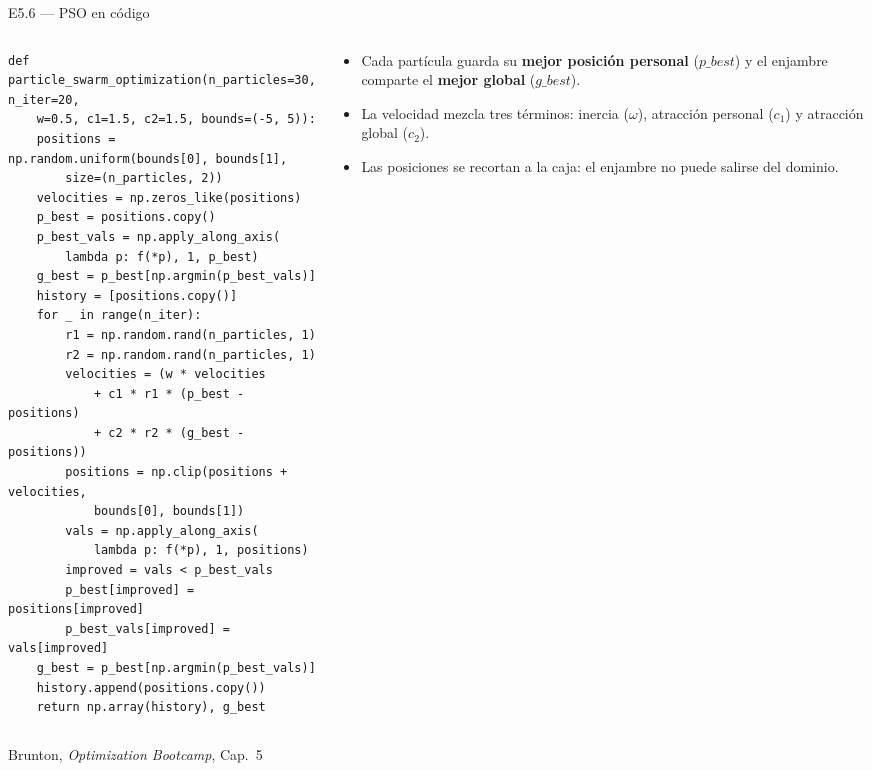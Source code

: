 \documentclass[10pt,aspectratio=169]{beamer}
\newcommand{\fuente}{\vfill{\scriptsize\color{gray}Brunton, \emph{Optimization Bootcamp}, Cap.~5}}
\begin{document}
\begin{frame}[fragile]{E5.6 --- PSO en código}
  \small
  \begin{columns}[T,onlytextwidth]
    \begin{column}{.55\textwidth}
      \begin{lstlisting}[style=pythontiny]
def particle_swarm_optimization(n_particles=30, n_iter=20,
    w=0.5, c1=1.5, c2=1.5, bounds=(-5, 5)):
    positions = np.random.uniform(bounds[0], bounds[1],
        size=(n_particles, 2))
    velocities = np.zeros_like(positions)
    p_best = positions.copy()
    p_best_vals = np.apply_along_axis(
        lambda p: f(*p), 1, p_best)
    g_best = p_best[np.argmin(p_best_vals)]
    history = [positions.copy()]
    for _ in range(n_iter):
        r1 = np.random.rand(n_particles, 1)
        r2 = np.random.rand(n_particles, 1)
        velocities = (w * velocities
            + c1 * r1 * (p_best - positions)
            + c2 * r2 * (g_best - positions))
        positions = np.clip(positions + velocities,
            bounds[0], bounds[1])
        vals = np.apply_along_axis(
            lambda p: f(*p), 1, positions)
        improved = vals < p_best_vals
        p_best[improved] = positions[improved]
        p_best_vals[improved] = vals[improved]
    g_best = p_best[np.argmin(p_best_vals)]
    history.append(positions.copy())
    return np.array(history), g_best
      \end{lstlisting}
    \end{column}
    \begin{column}{.41\textwidth}
      \begin{itemize}
        \item Cada partícula guarda su \textbf{mejor posición personal}
          ($p\_best$) y el enjambre comparte el \textbf{mejor global}
          ($g\_best$).
        \item La velocidad mezcla tres términos: inercia ($\omega$),
          atracción personal ($c_1$) y atracción global ($c_2$).
        \item Las posiciones se recortan a la caja: el enjambre no puede
          salirse del dominio.
      \end{itemize}
    \end{column}
  \end{columns}
  \fuente
\end{frame}
\end{document}
